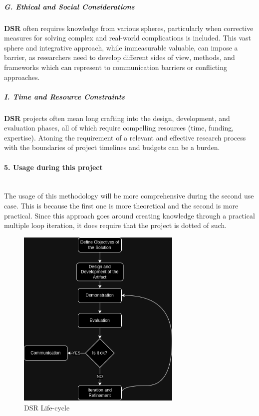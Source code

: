 \subparagraph{G.  Ethical and Social Considerations}\mbox{}

\textbf{DSR} often requires knowledge from various spheres, particularly when corrective measures for solving complex and real-world complications is included. This vast sphere and integrative approach, while immeasurable valuable, can impose a barrier, as researchers need to develop different sides of view, methods, and frameworks which can represent to communication barriers or conflicting approaches.

\subparagraph{I. Time and Resource Constraints}\mbox{}

\textbf{DSR} projects often mean long crafting into the design, development, and evaluation phases, all of which require compelling resources (time, funding, expertise). Atoning the requirement of a relevant and effective research process with the boundaries of project timelines and budgets can be a burden.

\paragraph{5. Usage during this project}\mbox{}\\

The usage of this methodology will be more comprehensive during the second use case. This is because the first one is more theoretical and the second is more practical. Since this approach goes around creating knowledge through a practical multiple loop iteration, it does require that the project is dotted of such.

\begin{figure}[H]
    \centering
    \includegraphics[width=0.7\textwidth]{assets/tools/dsr/DSR.drawio.png} %
    \caption{DSR Life-cycle}
    \label{fig:sample-image} 
\end{figure}

